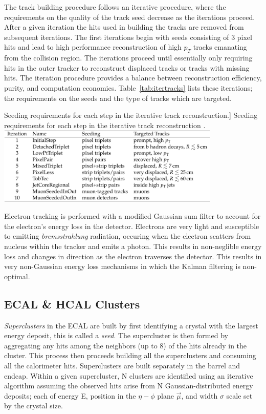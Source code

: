 The track building procedure follows an iterative procedure, where the requirements on the quality of the track seed decrease as the iterations proceed. After a given iteration the hits used in building the tracks are removed from subsequent iterations. The first iterations begin with seeds consisting of 3 pixel hits and lead to high performance reconstruction of high $p_{T}$ tracks emanating from the collision region. The iterations proceed until essentially only requiring hits in the outer tracker to reconstruct displaced tracks or tracks with missing hits. The iteration procedure provides a balance between reconstruction efficiency, purity, and computation economics. Table~\ref{tab:itertracks} lists these iterations; the requirements on the seeds and the type of tracks which are targeted.

\begin{table}[hbp!]
\caption
[Seeding requirements for each step in the iterative track reconstruction.]
{Seeding requirements for each step in the iterative track reconstruction \cite{CMS-PRF-14-001}.}
\centering
\includegraphics[width=0.8\textwidth]{figs/itertracks.png}
\label{tab:itertracks}
\end{table}

Electron tracking is performed with a modified Gaussian sum filter to account for the electron's energy loss in the detector. Electrons are very light and susceptible to emitting \textit{bremsstrahlung} radiation, occuring when the electron scatters from nucleus within the tracker and emits a photon. This results in non-neglible energy loss and changes in direction as the electron traverses the detector. This results in very non-Gaussian energy loss mechanisms in which the Kalman filtering is non-optimal.

\subsection{ECAL \& HCAL Clusters}

\textit{Superclusters} in the ECAL are built by first identifying a crystal with the largest energy deposit, this is called a \textit{seed}. The supercluster is then formed by aggregating any hits among the neighbors (up to 8) of the hits already in the cluster. This process then proceeds building all the superclusters and consuming all the calorimeter hits. Superclusters are built separately in the barrel and endcap. Within a given supercluster, N clusters are identified using an iterative algorithm assuming the observed hits arise from N Gaussian-distributed energy deposits; each of energy E, position in the $\eta-\phi$ plane $\vec{\mu}$, and width $\sigma$ scale set by the crystal size.

